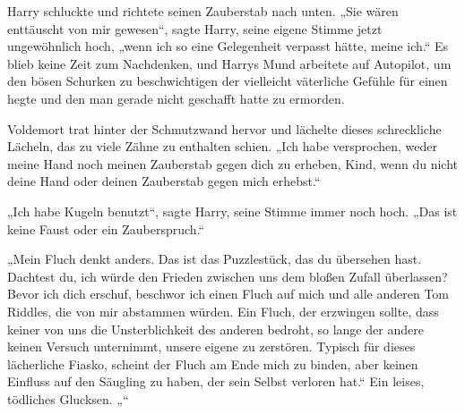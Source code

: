 Harry schluckte und richtete seinen Zauberstab nach unten.
„Sie wären enttäuscht von mir gewesen“, sagte Harry, seine eigene Stimme jetzt ungewöhnlich hoch, „wenn ich so eine Gelegenheit verpasst hätte, meine ich.“
Es blieb keine Zeit zum Nachdenken, und Harrys Mund arbeitete auf Autopilot, um den bösen Schurken zu beschwichtigen der vielleicht väterliche Gefühle für einen hegte und den man gerade nicht geschafft hatte zu ermorden.

Voldemort trat hinter der Schmutzwand hervor und lächelte dieses schreckliche Lächeln, das zu viele Zähne zu enthalten schien.
„Ich habe versprochen, weder meine Hand noch meinen Zauberstab gegen dich zu erheben, Kind, wenn du nicht deine Hand oder deinen Zauberstab gegen mich erhebst.“

„Ich habe Kugeln benutzt“, sagte Harry, seine Stimme immer noch hoch.
„Das ist keine Faust oder ein Zauberspruch.“

„Mein Fluch denkt anders. Das ist das Puzzlestück, das du übersehen hast. Dachtest du, ich würde den Frieden zwischen uns dem bloßen Zufall überlassen? Bevor ich dich erschuf, beschwor ich einen Fluch auf mich und alle anderen Tom Riddles, die von mir abstammen würden. Ein Fluch, der erzwingen sollte, dass keiner von uns die Unsterblichkeit des anderen bedroht, so lange der andere keinen Versuch unternimmt, unsere eigene zu zerstören. Typisch für dieses lächerliche Fiasko, scheint der Fluch am Ende mich zu binden, aber keinen Einfluss auf den Säugling zu haben, der sein Selbst verloren hat.“
Ein leises, tödliches Glucksen.
„“

